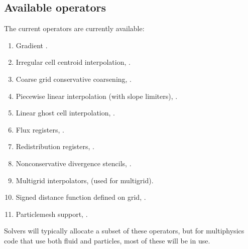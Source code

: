 \documentclass[letterpaper,10pt,english]{sphinxmanual}
\begin{document}
\subsection{Available operators}
\label{\detokenize{Source/Realm:available-operators}}
The current operators are currently available:
\begin{enumerate}
%
\item {} 
Gradient .

\item {} 
Irregular cell centroid interpolation, .

\item {} 
Coarse grid conservative coarsening, .

\item {} 
Piecewise linear interpolation (with slope limiters), .

\item {} 
Linear ghost cell interpolation, .

\item {} 
Flux registers, .

\item {} 
Redistribution registers, .

\item {} 
Non\sphinxhyphen{}conservative divergence stencils, .

\item {} 
Multigrid interpolators,  (used for multigrid).

\item {} 
Signed distance function defined on grid, .

\item {} 
Particle\sphinxhyphen{}mesh support, .

\end{enumerate}

Solvers will typically allocate a subset of these operators, but for multiphysics code that use both fluid and particles, most of these will be in use.
\end{document}
